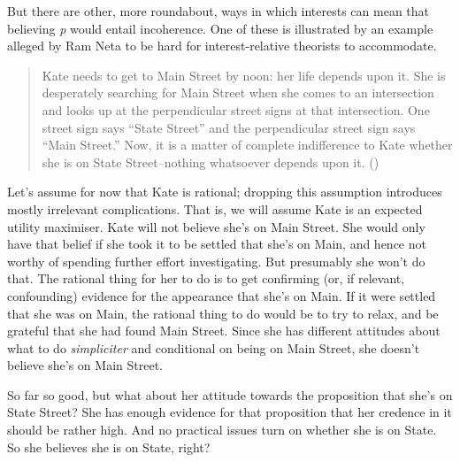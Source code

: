 \documentclass[
  11pt,
  letterpaper,
  DIV=11,
  numbers=noendperiod,
  twoside]{scrartcl}
\begin{document}
But there are other, more roundabout, ways in which interests can mean
that believing \emph{p} would entail incoherence. One of these is
illustrated by an example alleged by Ram Neta to be hard for
interest-relative theorists to accommodate.

\begin{quote}
Kate needs to get to Main Street by noon: her life depends upon it. She
is desperately searching for Main Street when she comes to an
intersection and looks up at the perpendicular street signs at that
intersection. One street sign says ``State Street'' and the
perpendicular street sign says ``Main Street.'' Now, it is a matter of
complete indifference to Kate whether she is on State Street--nothing
whatsoever depends upon it. ()
\end{quote}

Let's assume for now that Kate is rational; dropping this assumption
introduces mostly irrelevant complications. That is, we will assume Kate
is an expected utility maximiser. Kate will not believe she's on Main
Street. She would only have that belief if she took it to be settled
that she's on Main, and hence not worthy of spending further effort
investigating. But presumably she won't do that. The rational thing for
her to do is to get confirming (or, if relevant, confounding) evidence
for the appearance that she's on Main. If it were settled that she was
on Main, the rational thing to do would be to try to relax, and be
grateful that she had found Main Street. Since she has different
attitudes about what to do \emph{simpliciter} and conditional on being
on Main Street, she doesn't believe she's on Main Street.

So far so good, but what about her attitude towards the proposition that
she's on State Street? She has enough evidence for that proposition that
her credence in it should be rather high. And no practical issues turn
on whether she is on State. So she believes she is on State, right?
\end{document}
